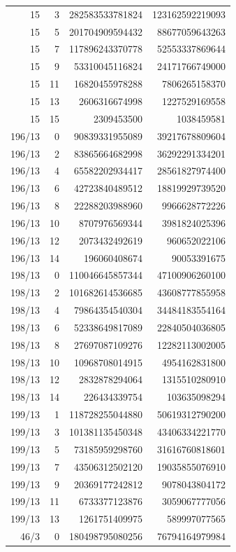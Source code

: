 \begin{longtable}{@{}rrrr@{}}
15 & 3 & 282583533781824 & 123162592219093\\
15 & 5 & 201704909594432 & 88677059643263\\
15 & 7 & 117896243370778 & 52553337869644\\
15 & 9 & 53310045116824 & 24171766749000\\
15 & 11 & 16820455978288 & 7806265158370\\
15 & 13 & 2606316674998 & 1227529169558\\
15 & 15 & 2309453500 & 1038459581\\
196/13 & 0 & 90839331955089 & 39217678809604\\
196/13 & 2 & 83865664682998 & 36292291334201\\
196/13 & 4 & 65582202934417 & 28561827974400\\
196/13 & 6 & 42723840489512 & 18819929739520\\
196/13 & 8 & 22288203988960 & 9966628772226\\
196/13 & 10 & 8707976569344 & 3981824025396\\
196/13 & 12 & 2073432492619 & 960652022106\\
196/13 & 14 & 196060408674 & 90053391675\\
198/13 & 0 & 110046645857344 & 47100906260100\\
198/13 & 2 & 101682614536685 & 43608777855958\\
198/13 & 4 & 79864354540304 & 34484183554164\\
198/13 & 6 & 52338649817089 & 22840504036805\\
198/13 & 8 & 27697087109276 & 12282113002005\\
198/13 & 10 & 10968708014915 & 4954162831800\\
198/13 & 12 & 2832878294064 & 1315510280910\\
198/13 & 14 & 226434339754 & 103635098294\\
199/13 & 1 & 118728255044880 & 50619312790200\\
199/13 & 3 & 101381135450348 & 43406334221770\\
199/13 & 5 & 73185959298760 & 31616760818601\\
199/13 & 7 & 43506312502120 & 19035855076910\\
199/13 & 9 & 20369177242812 & 9078043804172\\
199/13 & 11 & 6733377123876 & 3059067777056\\
199/13 & 13 & 1261751409975 & 589997077565\\
46/3 & 0 & 180498795080256 & 76794164979984\\

\end{longtable}
